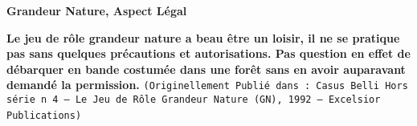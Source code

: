 \documentclass[11pt,twoside,a4paper]{article}
\title{\txtTITLE}
\date{ --- }
\def\txtTITLE{Grandeur Nature, Aspect L{\'e}gal} %
\begin{document}
\setlength\parindent{0pt} %

\begin{center}
	\textbf{\huge \txtTITLE}
\end{center}


\textbf{\scriptsize Le jeu de r{\^o}le grandeur nature a beau {\^e}tre un loisir, il ne se pratique pas sans quelques pr{\'e}cautions et autorisations. Pas question en effet de d{\'e}barquer en bande costum{\'e}e dans une for{\^e}t sans en avoir auparavant demand{\'e} la permission. } %
\texttt{\scriptsize{(Originellement Publi{\'e} dans : Casus Belli Hors s{\'e}rie n 4 -- Le Jeu de R{\^o}le Grandeur Nature (GN), 1992 -- Excelsior Publications)}}~\\
\end{document}
